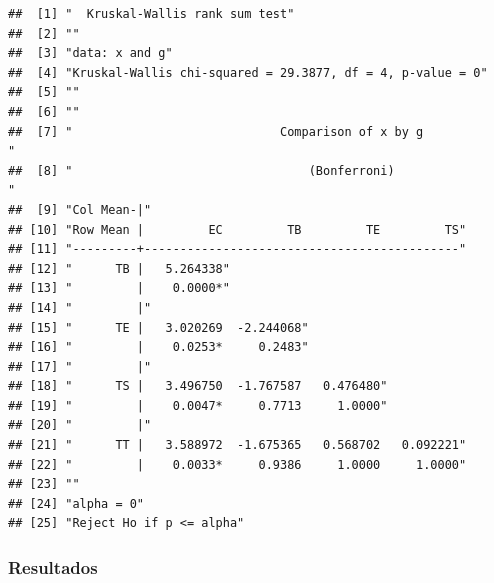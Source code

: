 \documentclass[]{article}
\begin{document}
\begin{verbatim}
##  [1] "  Kruskal-Wallis rank sum test"                                                 
##  [2] ""                                                                               
##  [3] "data: x and g"                                                                  
##  [4] "Kruskal-Wallis chi-squared = 29.3877, df = 4, p-value = 0"                      
##  [5] ""                                                                               
##  [6] ""                                                                               
##  [7] "                             Comparison of x by g                              "
##  [8] "                                 (Bonferroni)                                  "
##  [9] "Col Mean-|"                                                                     
## [10] "Row Mean |         EC         TB         TE         TS"                         
## [11] "---------+--------------------------------------------"                         
## [12] "      TB |   5.264338"                                                          
## [13] "         |    0.0000*"                                                          
## [14] "         |"                                                                     
## [15] "      TE |   3.020269  -2.244068"                                               
## [16] "         |    0.0253*     0.2483"                                               
## [17] "         |"                                                                     
## [18] "      TS |   3.496750  -1.767587   0.476480"                                    
## [19] "         |    0.0047*     0.7713     1.0000"                                    
## [20] "         |"                                                                     
## [21] "      TT |   3.588972  -1.675365   0.568702   0.092221"                         
## [22] "         |    0.0033*     0.9386     1.0000     1.0000"                         
## [23] ""                                                                               
## [24] "alpha = 0"                                                                      
## [25] "Reject Ho if p <= alpha"
\end{verbatim}

\hypertarget{resultados}{%
\subsubsection{Resultados}\label{resultados}}
\end{document}
